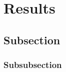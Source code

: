 \documentclass[a4paper, 11pt]{lt_article}
\begin{document}
\blindtext


\section{Results} %

\subsection{Subsection} %

\Blindtext[1]

\subsubsection{Subsubsection}
\Blindtext[1]
\end{document}
